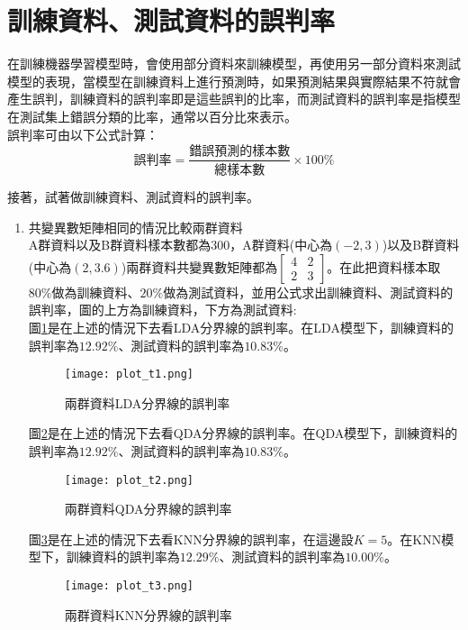 \documentclass[12pt, a4paper]{article}
\begin{document}
\section{訓練資料、測試資料的誤判率}
在訓練機器學習模型時，會使用部分資料來訓練模型，再使用另一部分資料來測試模型的表現，當模型在訓練資料上進行預測時，如果預測結果與實際結果不符就會產生誤判，訓練資料的誤判率即是這些誤判的比率，而測試資料的誤判率是指模型在測試集上錯誤分類的比率，通常以百分比來表示。\\
誤判率可由以下公式計算：$$\text{誤判率}=\frac{\text{錯誤預測的樣本數}}{\text{總樣本數}}×100\%$$

接著，試著做訓練資料、測試資料的誤判率。
\begin{enumerate}
\item 共變異數矩陣相同的情況比較兩群資料 \\
A群資料以及B群資料樣本數都為\;$300$\;，A群資料(中心為\;$(-2,3)$\;)以及B群資料(中心為\;$(2,3.6)$\;)兩群資料共變異數矩陣都為\;$\begin{bmatrix}4 & 2 \\2 & 3 \end{bmatrix}$\;。在此把資料樣本取\;$80\%$\;做為訓練資料、\;$20\%$\;做為測試資料，並用公式求出訓練資料、測試資料的誤判率，圖的上方為訓練資料，下方為測試資料\;:\\
圖\;\ref{fig:plot_t1.png}\;是在上述的情況下去看\;LDA\;分界線的誤判率。在LDA模型下，訓練資料的誤判率為\;$12.92\%$\;、測試資料的誤判率為\;$10.83\%$\;。

\begin{figure}[H]
\centering
\texttt{[image: plot\_t1.png]}
\caption{兩群資料LDA分界線的誤判率}
\label{fig:plot_t1.png}
\end{figure}

圖\;\ref{fig:plot_t2.png}\;是在上述的情況下去看\;QDA\;分界線的誤判率。在QDA模型下，訓練資料的誤判率為\;$12.92\%$\;、測試資料的誤判率為\;$10.83\%$\;。
\begin{figure}[h]
\centering
\texttt{[image: plot\_t2.png]}
\caption{兩群資料QDA分界線的誤判率}
\label{fig:plot_t2.png}
\end{figure}

圖\;\ref{fig:plot_t3.png}\;是在上述的情況下去看\;KNN\;分界線的誤判率，在這邊設\;$K=5$\;。在KNN模型下，訓練資料的誤判率為\;$12.29\%$\;、測試資料的誤判率為\;$10.00\%$\;。
\begin{figure}[H]
\centering
\texttt{[image: plot\_t3.png]}
\caption{兩群資料KNN分界線的誤判率}
\label{fig:plot_t3.png}
\end{figure}


\end{enumerate}
\end{document}
